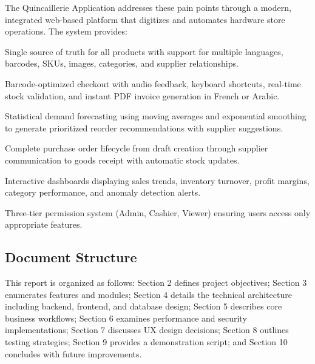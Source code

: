 The Quincaillerie Application addresses these pain points through a modern, integrated web-based platform that digitizes and automates hardware store operations. The system provides:

\begin{description}[leftmargin=2cm,style=nextline]
    \item[Centralized Product Database] Single source of truth for all products with support for multiple languages, barcodes, SKUs, images, categories, and supplier relationships.
    
    \item[Professional POS Interface] Barcode-optimized checkout with audio feedback, keyboard shortcuts, real-time stock validation, and instant PDF invoice generation in French or Arabic.
    
    \item[Intelligent Replenishment] Statistical demand forecasting using moving averages and exponential smoothing to generate prioritized reorder recommendations with supplier suggestions.
    
    \item[Automated Purchase Workflow] Complete purchase order lifecycle from draft creation through supplier communication to goods receipt with automatic stock updates.
    
    \item[Real-Time Analytics] Interactive dashboards displaying sales trends, inventory turnover, profit margins, category performance, and anomaly detection alerts.
    
    \item[Role-Based Access Control] Three-tier permission system (Admin, Cashier, Viewer) ensuring users access only appropriate features.
\end{description}

\subsection{Document Structure}

This report is organized as follows: Section 2 defines project objectives; Section 3 enumerates features and modules; Section 4 details the technical architecture including backend, frontend, and database design; Section 5 describes core business workflows; Section 6 examines performance and security implementations; Section 7 discusses UX design decisions; Section 8 outlines testing strategies; Section 9 provides a demonstration script; and Section 10 concludes with future improvements.
